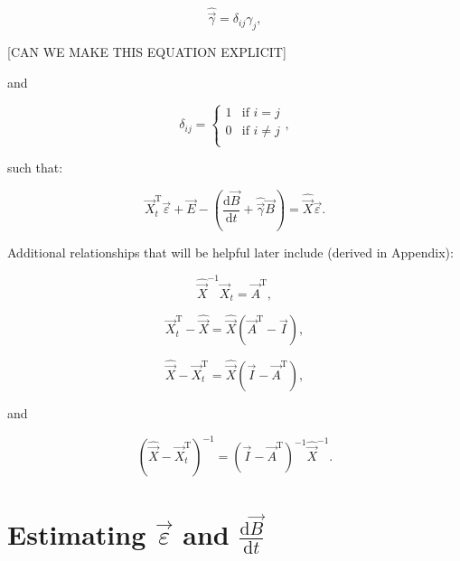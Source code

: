 \begin{equation} \label{eq:B_hat_matrix_def}
	\hat{\vec{\gamma}} = \delta_{ij}\gamma_{j},
\end{equation}

[CAN WE MAKE THIS EQUATION EXPLICIT]

\noindent and

\begin{equation}\label{eq:k_delta}
	\delta_{ij} = \begin{cases}	1 	& 	\text{if  } i = j		\\
												0	&	\text{if  } i \neq j	\\
						\end{cases},
\end{equation}

\noindent such that:

\begin{equation} \label{eq:matrix_leontief}
	\vec{X}_{t}^{\mathrm{T}}\vec{\varepsilon} + \vec{E} - \left(\frac{\mathrm{d}\vec{B}}{\mathrm{d}t} + \hat{\vec{\gamma}}\vec{B}\right) = \hat{\vec{X}}\vec{\varepsilon}.
\end{equation}

Additional relationships that will be helpful later include (derived in Appendix):

\begin{equation} \label{eq:Xhat_X_and_A}
	\hat{\vec{X}}^{-1}\vec{X}_{t} = \vec{A}^{\mathrm{T}},
\end{equation}

\begin{equation} \label{eq:Xdifference1}
	\vec{X}_{t}^{\mathrm{T}} - \hat{\vec{X}} = \hat{\vec{X}}(\vec{A}^{\mathrm{T}} - \vec{I}),
\end{equation}

\begin{equation} \label{eq:Xdifference2}
	\hat{\vec{X}} - \vec{X}_{t}^{\mathrm{T}} = \hat{\vec{X}}(\vec{I} - \vec{A}^{\mathrm{T}}),
\end{equation}

\noindent and

\begin{equation} \label{eq:Xdifference2_inverse}
	\left(\hat{\vec{X}} - \vec{X}_{t}^{\mathrm{T}}\right)^{-1} = (\vec{I} - \vec{A}^{\mathrm{T}})^{-1}\hat{\vec{X}}^{-1}.
\end{equation}


\section{Estimating $\vec{\varepsilon}$ and $\frac{\mathrm{d}\vec{B}}{\mathrm{d}t}$}

